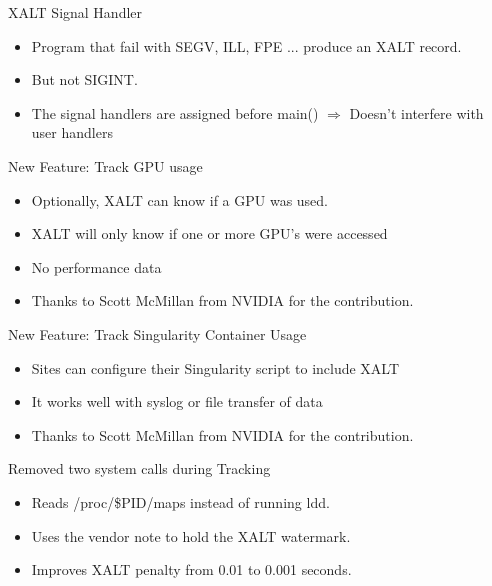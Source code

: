 \documentclass{beamer}
\begin{document}
\begin{frame}{XALT Signal Handler}
  \begin{itemize}
    \item Program that fail with SEGV, ILL, FPE ... produce an XALT record.
    \item But not SIGINT.
    \item The signal handlers are assigned before main() $\Rightarrow$
      Doesn't interfere with user handlers
  \end{itemize}
\end{frame}

\begin{frame}{New Feature: Track GPU usage}
  \begin{itemize}
    \item Optionally, XALT can know if a GPU was used.
    \item XALT will only know if one or more GPU's were accessed
    \item No performance data
    \item Thanks to Scott McMillan from NVIDIA for the contribution.
  \end{itemize}
\end{frame}

\begin{frame}{New Feature: Track Singularity Container Usage}
  \begin{itemize}
    \item Sites can configure their Singularity script to include XALT
    \item It works well with syslog or file transfer of data
    \item Thanks to Scott McMillan from NVIDIA for the contribution.
  \end{itemize}
\end{frame}

\begin{frame}{Removed two system calls during Tracking}
  \begin{itemize}
    \item Reads /proc/\$PID/maps instead of running ldd.
    \item Uses the vendor note to hold the XALT watermark.
    \item Improves XALT penalty from 0.01 to 0.001 seconds.
  \end{itemize}
\end{frame}
\end{document}
